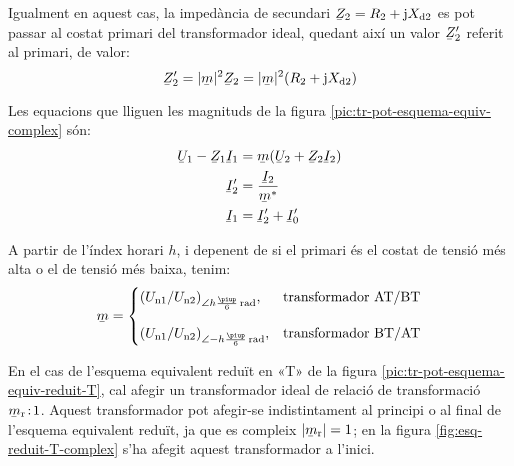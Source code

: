 \begin{center}
    
    \label{pic:tr-pot-esquema-equiv-complex}
\end{center}

Igualment en aquest cas, la impedància de secundari $\cmplx{Z}_2=R_2 + \ju X\ped{d2}$ es pot passar al costat primari del transformador ideal, quedant així un valor $\cmplx{Z}_2'$ referit al primari, de valor:
\begin{equation}
    \cmplx{Z}_2' = |\cmplx{m}|^2 \cmplx{Z}_2  = |\cmplx{m}|^2 (R_2 + \ju X\ped{d2})\label{eq:ZmZ}
\end{equation}

Les equacions que lliguen les magnituds de la figura \vref{pic:tr-pot-esquema-equiv-complex} són:
\begin{subequations}
\begin{align}
    \cmplx{U}_1 - \cmplx{Z}_1 \cmplx{I}_1 &= \cmplx{m} ( \cmplx{U}_2  + \cmplx{Z}_2 \cmplx{I}_2 ) \label{eq:UmZ}\\
    \cmplx{I}'_2 &= \frac{\cmplx{I}_2}{\cmplx{m}^*} \label{eq:ImI}\\
    \cmplx{I}_1  &=   \cmplx{I}_2' + \cmplx{I}_0' \label{eq:III}
\end{align}
\end{subequations}

A partir de l'índex horari $h$, i depenent de si el primari és el costat de tensió més alta o el de tensió més baixa, tenim:
\begin{equation}
\cmplx{m} = \begin{cases}
     (U\ped{n1}/U\ped{n2})_{\angle h \frac{\piup}{6}\unit{\,rad}}, & \text{transformador AT/BT}\\[2.7ex]
     (U\ped{n1}/U\ped{n2})_{\angle -h \frac{\piup}{6}\unit{\,rad}}, & \text{transformador BT/AT}
\end{cases}
\label{eq:rel-transf-cmplx}
\end{equation}

En el cas de l'esquema equivalent reduït en «T» de la figura \vref{pic:tr-pot-esquema-equiv-reduit-T}, cal afegir un transformador ideal de relació de transformació  $\cmplx{m}\ped{r}\!:\!1$. Aquest transformador pot afegir-se indistintament  al principi o al final de l'esquema equivalent reduït, ja que es compleix $|\cmplx{m}\ped{r}|=1$;  en la figura \vref{fig:esq-reduit-T-complex} s'ha afegit aquest transformador a l'inici.


